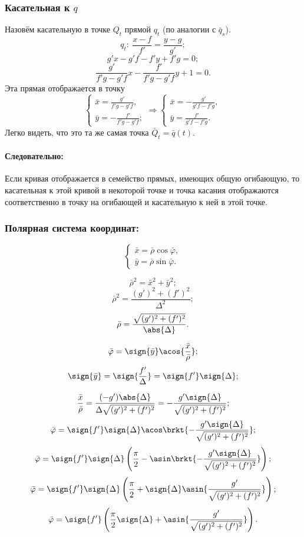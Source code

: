 \subsubsection{Касательная к $q$}
Назовём касательную в точке $Q_t$ прямой $q_t$ (по аналогии с $\bar{q}_s$).
$$q_t:\: \frac{x - f}{f'} = \frac{y - g}{g'};$$
$$g'x - g'f - f'y + f'g = 0;$$
$$\frac{g'}{f'g - g'f}x - \frac{f'}{f'g - g'f}y + 1 = 0.$$
Эта прямая отображается в точку 
$$
\left\{
\begin{gathered}
	\bar{x} = \frac{g'}{f'g - g'f}, \\
	\bar{y} = - \frac{f'}{f'g - g'f};
\end{gathered}
\right.
\Rightarrow
\left\{
\begin{gathered}
	\bar{x} = - \frac{g'}{g'f - f'g}, \\
	\bar{y} = \frac{f'}{g'f - f'g}.
\end{gathered}
\right.
$$
Легко видеть, что это та же самая точка $\bar{Q}_t = \bar{q}(t)$.

\paragraph{Следовательно:} Если кривая отображается в семейство прямых, имеющих общую огибающую, то касательная к этой кривой в некоторой точке и точка касания отображаются соответственно в точку на огибающей и касательную к ней в этой точке.

\subsubsection{Полярная система координат:}
$$\left\{
\begin{gathered}
	\bar{x} = \bar{\rho}\cos{\bar{\varphi}}, \\
	\bar{y} = \bar{\rho}\sin{\bar{\varphi}}.
\end{gathered}
\right.
$$

$$\bar{\rho}^2 = \bar{x}^2 + \bar{y}^2;$$
$$\bar{\rho}^2 = \frac{(g')^2 + (f')^2}{\Delta^2};$$
$$\bar{\rho} = \frac{\sqrt{(g')^2 + (f')^2}}{\abs{\Delta}}.$$

$$\bar{\varphi} = \sign{\bar{y}}\acos{\frac{\bar{x}}{\bar{\rho}}};$$
$$\sign{\bar{y}} = \sign{\frac{f'}{\Delta}} = \sign{f'}\sign{\Delta};$$

$$\frac{\bar{x}}{\bar{\rho}} = \frac{
	(-g')\abs{\Delta}
}{
	\Delta\sqrt{(g')^2 + (f')^2}
} = -\frac{g'\sign{\Delta}}{\sqrt{(g')^2 + (f')^2}};$$
$$\bar{\varphi} = \sign{f'}\sign{\Delta}\acos\brkt{-\frac{g'\sign{\Delta}}{\sqrt{(g')^2 + (f')^2}}};$$
$$\bar{\varphi} = \sign{f'}\sign{\Delta}\left(\frac{\pi}{2} - \asin\brkt{-\frac{g'\sign{\Delta}}{\sqrt{(g')^2 + (f')^2}}}\right);$$
$$\bar{\varphi} = \sign{f'}\sign{\Delta}\left(\frac{\pi}{2} + \sign{\Delta}\asin{\frac{g'}{\sqrt{(g')^2 + (f')^2}}}\right);$$
$$\bar{\varphi} = \sign{f'}\left(\frac{\pi}{2}\sign{\Delta} + \asin{\frac{g'}{\sqrt{(g')^2 + (f')^2}}}\right).$$

